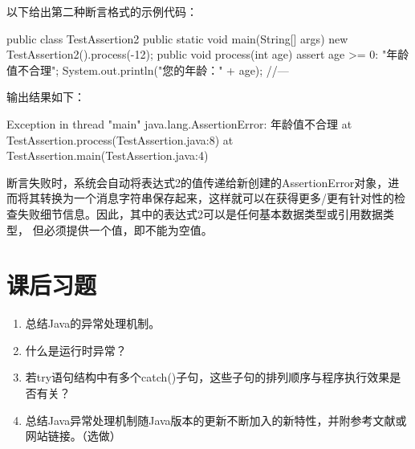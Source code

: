 以下给出第二种断言格式的示例代码：


\begin{javaCode}
public class TestAssertion2 {
  public static void main(String[] args) {
    new TestAssertion2().process(-12);
  }
  public void process(int age) {
    assert age >= 0: "年龄值不合理";
    System.out.println("您的年龄：" + age);
    //---
  }
}
\end{javaCode}

输出结果如下：

\begin{stdoutCode}
Exception in thread "main" java.lang.AssertionError: 年龄值不合理
	at TestAssertion.process(TestAssertion.java:8)
	at TestAssertion.main(TestAssertion.java:4)  
\end{stdoutCode}


断言失败时，系统会自动将表达式2的值传递给新创建的AssertionError对象，进
而将其转换为一个消息字符串保存起来，这样就可以在获得更多/更有针对性的检
查失败细节信息。因此，其中的表达式2可以是任何基本数据类型或引用数据类型，
但必须提供一个值，即不能为空值。

\section{课后习题}

\begin{enumerate}
\item 总结Java的异常处理机制。
\item 什么是运行时异常？
\item 若try语句结构中有多个catch()子句，这些子句的排列顺序与程序执行效果是否有关？
\item 总结Java异常处理机制随Java版本的更新不断加入的新特性，并附参考文献或网站链接。（选做）
\end{enumerate}